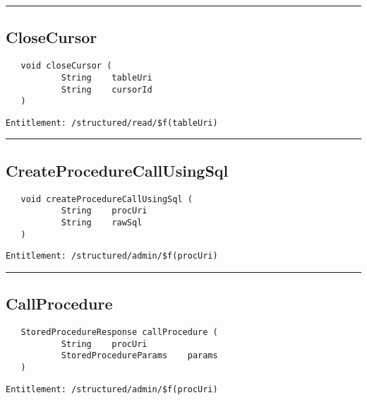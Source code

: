 \rule{12cm}{2pt}
\subsection{CloseCursor}
\label{Api:CloseCursor}
\begin{verbatim}
   void closeCursor (
           String    tableUri
           String    cursorId
   )
\end{verbatim}
\begin{Verbatim}[fontsize=\small, formatcom=\color{Maroon}]
  Entitlement: /structured/read/$f(tableUri)
\end{Verbatim}



\rule{12cm}{2pt}
\subsection{CreateProcedureCallUsingSql}
\label{Api:CreateProcedureCallUsingSql}
\begin{verbatim}
   void createProcedureCallUsingSql (
           String    procUri
           String    rawSql
   )
\end{verbatim}
\begin{Verbatim}[fontsize=\small, formatcom=\color{Maroon}]
  Entitlement: /structured/admin/$f(procUri)
\end{Verbatim}



\rule{12cm}{2pt}
\subsection{CallProcedure}
\label{Api:CallProcedure}
\begin{verbatim}
   StoredProcedureResponse callProcedure (
           String    procUri
           StoredProcedureParams    params
   )
\end{verbatim}
\begin{Verbatim}[fontsize=\small, formatcom=\color{Maroon}]
  Entitlement: /structured/admin/$f(procUri)
\end{Verbatim}




